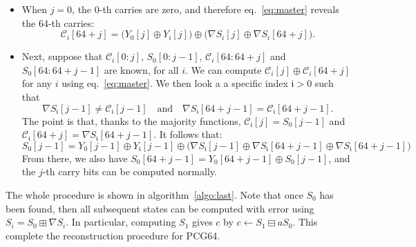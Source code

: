\documentclass[submission,svgnames,journal=tosc]{iacrtrans}
\begin{document}
\begin{itemize}
\item When $j=0$, the $0$-th carries are zero, and therefore eq.~\eqref{eq:master}
reveals the 64-th carries:
\[
  \mathcal{C}_i[64+j] = \bigl( Y_0[j] \oplus Y_i[j] \bigr)  \oplus \bigl( \nabla S_i[j] \oplus \nabla S_i[64+j] \bigr).
\]

\item Next, suppose that $\mathcal{C}_i[0:j]$, $S_0[0:j-1]$, $\mathcal{C}_i[64:64+j]$
and $S_0[64:64+j-1]$ are known, for all $i$. We can compute
$\mathcal{C}_i[j] \oplus \mathcal{C}_i[64+j]$ for any $i$ using
eq.~\eqref{eq:master}. We then look a a specific index $\mathfrak{i} > 0$ such that
\[
   \nabla S_{\mathfrak{i}}[j-1] \neq \mathcal{C}_{\mathfrak{i}}[j-1] \quad \text{and} \quad \nabla S_{\mathfrak{i}}[64 + j-1] = \mathcal{C}_{\mathfrak{i}}[64 + j-1].
\]
The point is that, thanks to the majority functions,
$\mathcal{C}_{\mathfrak{i}}[j] = S_0[j-1]$ and
$\mathcal{C}_{\mathfrak{i}}[64+j] = \nabla S_{\mathfrak{i}}[64 + j-1]$. It follows
that:
\[
  S_0[j-1] = Y_0[j-1] \oplus Y_{\mathfrak{i}}[j-1] \oplus \bigl( \nabla S_{\mathfrak{i}}[j-1] \oplus \nabla S_{\mathfrak{i}}[64+j-1] \oplus \nabla S_{\mathfrak{i}}[64 + j-1]\bigr)
\]
From there, we also have $S_0[64+j-1] = Y_0[64+j-1] \oplus S_0[j-1]$, and the
$j$-th carry bits can be computed normally.
\end{itemize}

The whole procedure is shown in algorithm~\ref{algo:last}. Note that once $S_0$
has been found, then all subsequent states can be computed with error using
$S_i = S_0 \boxplus \nabla S_i$. In particular, computing $S_1$ gives $c$ by
$c \gets S_1 \boxminus a S_0$. This complete the reconstruction procedure for
\textsf{PCG64}.
\end{document}
